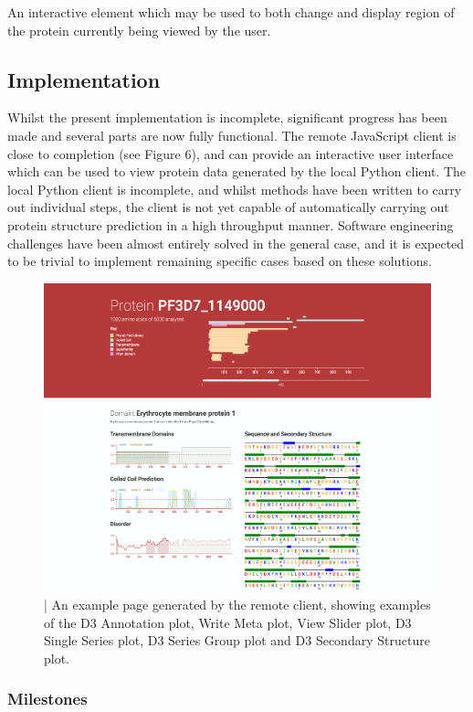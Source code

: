 \documentclass[fleqn,10pt]{article} %
\begin{document}
An interactive element which may be used to both change and display region of the protein currently being viewed by the user.

\subsection{Implementation}

Whilst the present implementation is incomplete, significant progress has been made and several parts are now fully functional. The remote JavaScript client is close to completion (see Figure 6), and can provide an interactive user interface which can be used to view protein data generated by the local Python client. The local Python client is incomplete, and whilst methods have been written to carry out individual steps, the client is not yet capable of automatically carrying out protein structure prediction in a high throughput manner. Software engineering challenges have been almost entirely solved in the general case, and it is expected to be trivial to implement remaining specific cases based on these solutions.

\begin{figure}
\includegraphics[width=12cm]{figs/weball}
\caption{ | An example page generated by the remote client, showing examples of the D3 Annotation plot, Write Meta plot, View Slider plot, D3 Single Series plot, D3 Series Group plot and D3 Secondary Structure plot.}
\end{figure}

\subsubsection{Milestones}
\end{document}

